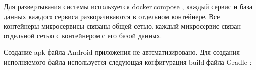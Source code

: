 Для развертывания системы используется docker compose \cite{dockercompose}, каждый сервис и база данных каждого сервиса разворачиваются в отдельном контейнере. Все контейнеры-микросервисы связаны общей сетью, каждый микросервис связан отдельной сетью с контейнером с его базой данных.

Создание apk-файла Android-приложения не автоматизировано. Для  создания исполняемого файла используется следующая конфигурация build-файла Gradle \cite{gradle}:

